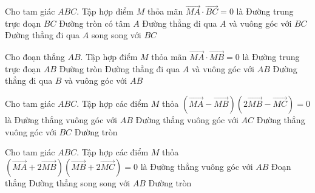 \begin{ex}%
	Cho tam giác $ABC$. Tập hợp điểm $M$ thỏa mãn $\overrightarrow{MA}\cdot \overrightarrow{BC}=0$ là
	\choice 
	{Đường trung trực đoạn $BC$}
	{Đường tròn có tâm $A$}
	{\True Đường thẳng đi qua $A$ và vuông góc với $BC$}
	{Đường thẳng đi qua $A$ song song với $BC$}
\end{ex}
\begin{ex}%
	Cho đoạn thẳng $AB$. Tập hợp điểm $M$ thỏa mãn $\overrightarrow{MA}\cdot \overrightarrow{MB}=0$ là
	\choice 
	{Đường trung trực đoạn $AB$}
	{\True Đường tròn}
	{Đường thẳng đi qua $A$ và vuông góc với $AB$}
	{Đường thẳng đi qua $B$ và vuông góc với $AB$}
\end{ex}
\begin{ex}%
	Cho tam giác $ABC$. Tập hợp các điểm $M$ thỏa $\left( \overrightarrow{MA}-\overrightarrow{MB} \right)\left( 2\overrightarrow{MB}-\overrightarrow{MC} \right)=0$ là 
	\choice 
	{\True Đường thẳng vuông góc với $AB$}
	{Đường thẳng vuông góc với $AC$}
	{Đường thẳng vuông góc với $BC$}
	{Đường tròn}
\end{ex}
\begin{ex}%
	Cho tam giác $ABC$. Tập hợp các điểm $M$ thỏa $\left( \overrightarrow{MA}+2\overrightarrow{MB} \right)\left( \overrightarrow{MB}+2\overrightarrow{MC} \right)=0$ là
	\choice 
	{Đường thẳng vuông góc với $AB$}
	{Đoạn thẳng}
	{Đường thẳng song song với $AB$}
	{\True Đường tròn}
\end{ex}
